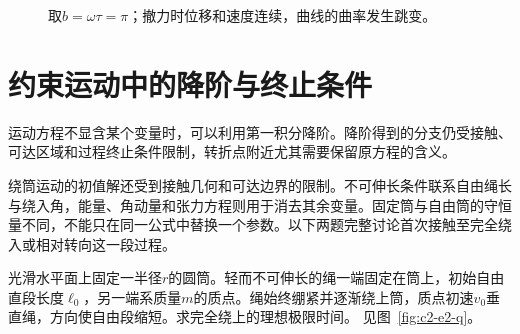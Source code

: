 \begin{solution}
\begin{figure}[H]
\caption{取$b=\omega\tau=\pi$；撤力时位移和速度连续，曲线的曲率发生跳变。}\label{fig:c2-v1-s}
\end{figure}
\end{solution}



\section{约束运动中的降阶与终止条件}
运动方程不显含某个变量时，可以利用第一积分降阶。降阶得到的分支仍受接触、可达区域和过程终止条件限制，转折点附近尤其需要保留原方程的含义。

绕筒运动的初值解还受到接触几何和可达边界的限制。不可伸长条件联系自由绳长与绕入角，能量、角动量和张力方程则用于消去其余变量。固定筒与自由筒的守恒量不同，不能只在同一公式中替换一个参数。以下两题完整讨论首次接触至完全绕入或相对转向这一段过程。
\begin{example}[质点绕固定圆筒]\label{ex:c2-e2}
光滑水平面上固定一半径$r$的圆筒。轻而不可伸长的绳一端固定在筒上，初始自由直段长度$\ell_0$，另一端系质量$m$的质点。绳始终绷紧并逐渐绕上筒，质点初速$v_0$垂直绳，方向使自由段缩短。求完全绕上的理想极限时间。 见图~\ref{fig:c2-e2-q}。
\end{example}

